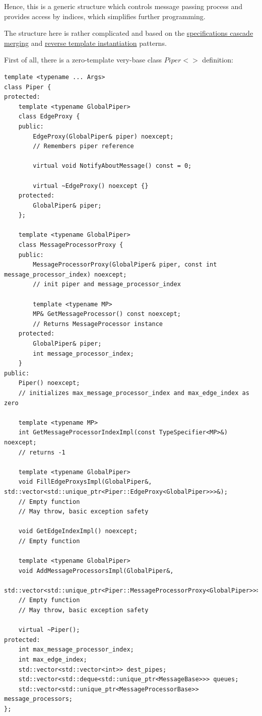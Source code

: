 \documentclass{article}
\begin{document}
Hence, this is  a generic structure which controls message passing process and provides access by indices, which simplifies further programming.

The structure here is rather complicated and based on the \hyperref[subsec:specifications_cascade_merging]{specifications cascade merging} and \hyperref[subsec:reverse_template_instantiation]{reverse template instantiation} patterns.

First of all, there is a zero-template very-base class $Piper<>$ definition:
\begin{lstlisting}
template <typename ... Args>
class Piper {
protected:
	template <typename GlobalPiper>
	class EdgeProxy {
	public:
		EdgeProxy(GlobalPiper& piper) noexcept;
		// Remembers piper reference

		virtual void NotifyAboutMessage() const = 0;

		virtual ~EdgeProxy() noexcept {}
	protected:
		GlobalPiper& piper;
	};

	template <typename GlobalPiper>
	class MessageProcessorProxy {
	public:
		MessageProcessorProxy(GlobalPiper& piper, const int message_processor_index) noexcept;
		// init piper and message_processor_index

		template <typename MP>
		MP& GetMessageProcessor() const noexcept;
		// Returns MessageProcessor instance
	protected:
		GlobalPiper& piper;
		int message_processor_index;
	}
public:
	Piper() noexcept;
	// initializes max_message_processor_index and max_edge_index as zero

	template <typename MP>
	int GetMessageProcessorIndexImpl(const TypeSpecifier<MP>&) noexcept;
	// returns -1

	template <typename GlobalPiper>
	void FillEdgeProxysImpl(GlobalPiper&, std::vector<std::unique_ptr<Piper::EdgeProxy<GlobalPiper>>>&);
	// Empty function
	// May throw, basic exception safety

	void GetEdgeIndexImpl() noexcept;
	// Empty function

	template <typename GlobalPiper>
	void AddMessageProcessorsImpl(GlobalPiper&,
		std::vector<std::unique_ptr<Piper::MessageProcessorProxy<GlobalPiper>>>&);
	// Empty function
	// May throw, basic exception safety

	virtual ~Piper();
protected:
	int max_message_processor_index;
	int max_edge_index;
	std::vector<std::vector<int>> dest_pipes;
	std::vector<std::deque<std::unique_ptr<MessageBase>>> queues;
	std::vector<std::unique_ptr<MessageProcessorBase>> message_processors;
};
\end{lstlisting}
\end{document}
